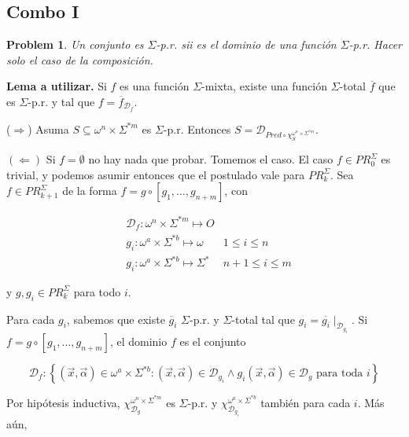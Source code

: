 \documentclass[a4paper, 12pt]{article}
\newtheorem{problem}{Problem}
\newtheorem{problem}{Problem}
\begin{document}
\pagebreak 






\subsection{Combo I}

\begin{problem}
    Un conjunto es $\Sigma$-p.r. sii es el dominio de una función $\Sigma$-p.r.
    Hacer solo el caso de la composición.
\end{problem}

\textbf{Lema a utilizar.} Si $f$ es una función $\Sigma$-mixta, existe una
función $\Sigma$-total  $\overline{f}$ que es $\Sigma$-p.r. y tal que $f =
\overline{f}_{\mathcal{D}_f}$.


($\Rightarrow$) Asuma $S \subseteq \omega^{n} \times \Sigma^{*m} $ es $\Sigma$-p.r. Entonces $S = \mathcal{D}_{Pred \circ
\chi_{S}^{\omega^{n} \times \Sigma^{*m} }}$. 

$(\Leftarrow)$ Si $f = \emptyset$ no hay nada que probar. Tomemos el caso. El caso $f \in PR_0^{\Sigma}$ es trivial, y podemos asumir entonces que el
postulado vale para $PR_{k}^{\Sigma}$. Sea $f \in PR_{k+1}^{\Sigma}$ de la forma
$f = g \circ \left[ g_1, \ldots, g_{n+m} \right] $, con 

\begin{align*}
    &\mathcal{D}_f : \omega^{n} \times \Sigma^{*m} \mapsto O & ~ \\ 
    &g_i : \omega^{a} \times \Sigma^{*b}  \mapsto  \omega & 1 \leq i \leq n\\
    &g_i : \omega^{a} \times \Sigma^{*b}  \mapsto \Sigma^{*} & n + 1 \leq i \leq
    m
\end{align*}

y $g, g_i \in PR_{k}^{\Sigma}$ para todo $i$.

Para cada $g_i$, sabemos que existe $\overline{g}_i$ $\Sigma$-p.r. y
$\Sigma$-total tal que $g_i = \overline{g_i}\mid_{\mathcal{D}_{g_i}}$. Si $f = g
\circ \left[ g_1, \ldots, g_{n+m} \right] $, el dominio $f$ es el conjunto

$$\mathcal{D}_f : \left\{ (\vec{x}, \vec{\alpha}) \in \omega^{a} \times
\Sigma^{*b} : (\vec{x}, \vec{\alpha}) \in \mathcal{D}_{g_i} \land g_i(\vec{x},
\vec{\alpha}) \in \mathcal{D}_{g} \text{ para toda } i \right\} $$

Por hipótesis inductiva, $\chi_{\mathcal{D}_g}^{\omega^{n} \times \Sigma^{*m}}$
es $\Sigma$-p.r. y $\chi_{\mathcal{D}_{g_i}}^{\omega^{a} \times \Sigma^{*b} }$
también para cada $i$. Más aún, 
\end{document}
